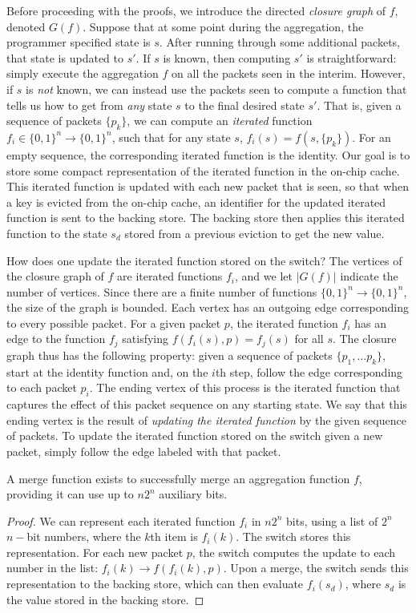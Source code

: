 Before proceeding with the proofs, we introduce the directed \emph{closure graph} of $f$, denoted $G(f)$. Suppose that at some point during the aggregation, 
the programmer specified state is $s$. After running through some additional packets, that state is updated to $s'$. If $s$ is known, then computing
$s'$ is straightforward: simply execute the aggregation $f$ on all the packets seen in the interim. However, if $s$ is \emph{not} known, we can instead
use the packets seen to compute a function that tells us how to get from \emph{any} state $s$ to the final desired state $s'$. That is, given a sequence of packets $\{p_k\}$,
we can compute an \emph{iterated} function $f_i \in \{0,1\}^n \rightarrow \{0,1\}^n$, such that for any state $s$, $f_i(s) = f(s, \{p_k\})$. For an empty sequence, the corresponding iterated function is the identity.
Our goal is to store some compact representation of the iterated function in the on-chip cache. This iterated function is updated with each new packet that is seen, so that when a key is evicted from the on-chip cache,
an identifier for the updated iterated function is sent to the backing store. The backing store then applies this iterated function to the state $s_d$ stored from a previous eviction to get the new value.

How does one update the iterated function stored on the switch? The vertices of the closure graph of $f$ are iterated functions $f_i$, and we let $|G(f)|$ indicate the number of vertices. Since there are a finite number of functions $\{0, 1\}^n \rightarrow \{0, 1\}^n$, the size of the graph is bounded.
Each vertex has an outgoing edge corresponding to every possible packet. For a given packet $p$, the iterated function $f_i$ has an edge to the function $f_j$ satisfying $f(f_i(s), p) = f_j(s)$ for all $s$.
The closure graph thus has the following property: given a sequence of packets $\{p_1, \ldots p_k\}$, start at the identity function and, on the $i$th step, follow the edge corresponding to each packet $p_i$. The ending vertex of this process is the iterated function that captures the effect of this packet sequence on any starting state. We say that this ending vertex is the result of \emph{updating the iterated function} by the given sequence of packets. To update the iterated function stored on the switch given a new packet, simply follow the edge labeled with that packet.

\begin{theorem}[Theorem 4.3.1]
A merge function exists to successfully merge an aggregation function $f$, providing it can use up to $n2^n$ auxiliary bits.
\end{theorem}
\begin{proof}
We can represent each iterated function $f_i$ in $n2^n$ bits, using a list of $2^n$ $n-$bit numbers, where the $k$th item is $f_i(k)$. The switch stores this representation. For each new packet $p$, the switch computes the update to each number in the list: $f_i(k) \rightarrow f(f_i(k), p)$. Upon a merge, the switch sends this representation to the backing store, which can then evaluate $f_i(s_d)$, where $s_d$ is the value stored in the backing store.
\end{proof}

